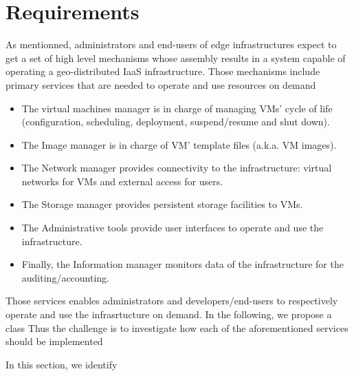 \section{Requirements}
\label{sec:requirements}

As mentionned, administrators and end-users of edge infrastructures expect to get a set of high
level mechanisms whose assembly results in a system capable of
operating a geo-distributed IaaS infrastructure.
Those mechanisms include primary services that are needed to operate and use resources on demand~\cite{6165242} 
\begin{itemize}
\item The virtual machines manager is in charge of managing VMs’ cycle
  of life (configuration, scheduling, deployment, suspend/resume and
  shut down).
\item The Image manager is in charge of VM’ template files (a.k.a. VM
  images).
\item The Network manager provides connectivity to the infrastructure:
  virtual networks for VMs and external access for users.
\item The Storage manager provides persistent storage facilities to
  VMs.
\item The Administrative tools provide user interfaces to operate and
  use the infrastructure.
\item Finally, the Information manager monitors data of the
  infrastructure for the auditing/accounting.
\end{itemize}

Those services enables administrators and developers/end-users to respectively operate and use the infrasrtucture on demand.
In the following, we propose a class
Thus the challenge is to investigate how each of the aforementioned services should be implemented


In this section, we identify



